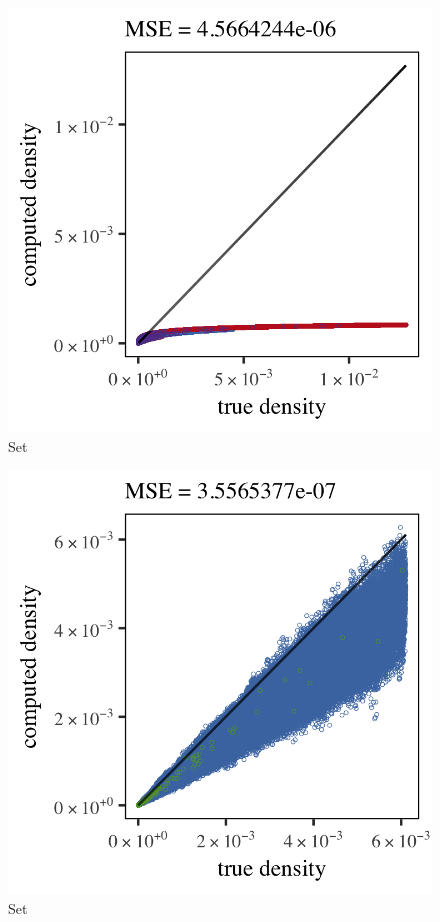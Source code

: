 \begin{subfigure}{0.3\textwidth}
	\centering
	\includegraphics[keepaspectratio=true, width=\textwidth, height=0.23\textheight]{4/img/results_ferdosi_3_1200000_mbe_breiman}
	\caption{Set \ferdosiThree}
	\label{fig:4:simulated:datasets:mbe:ferdosi3}
\end{subfigure}	
\begin{subfigure}{0.3\textwidth}
	\centering
	\includegraphics[keepaspectratio=true, width=\textwidth, height=0.23\textheight]{4/img/results_baakman_1_600000_mbe_breiman}
	\caption{Set \baakmanOne}
	\label{fig:4:simulated:datasets:mbe:baakman1}
\end{subfigure}
